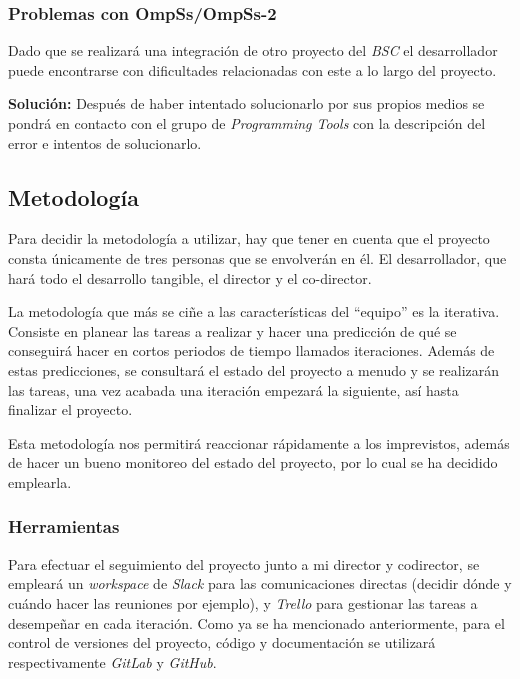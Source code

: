 \subsubsection{Problemas con OmpSs/OmpSs-2}

Dado que se realizará una integración de otro proyecto del \textit{BSC} el desarrollador puede encontrarse con dificultades relacionadas con este a lo largo del proyecto.
\par\medskip

\textbf{Solución:} Después de haber intentado solucionarlo por sus propios medios se pondrá en contacto con el grupo de \textit{Programming Tools} con la descripción del error e intentos de solucionarlo.

\subsection{Metodología}

Para decidir la metodología a utilizar, hay que tener en cuenta que el proyecto consta únicamente de tres personas que se envolverán en él. El desarrollador, que hará todo el desarrollo tangible, el director y el co-director. 
\par\bigskip

La metodología que más se ciñe a las características del ``equipo'' es la iterativa. Consiste en planear las tareas a realizar y hacer una predicción de qué se conseguirá hacer en cortos periodos de tiempo llamados iteraciones. Además de estas predicciones, se consultará el estado del proyecto a menudo y se realizarán las tareas, una vez acabada una iteración empezará la siguiente, así hasta finalizar el proyecto.
\par\bigskip
Esta metodología nos permitirá reaccionar rápidamente a los imprevistos, además de hacer un bueno monitoreo del estado del proyecto, por lo cual se ha decidido emplearla.

\subsubsection{Herramientas}

Para efectuar el seguimiento del proyecto junto a mi director y codirector, se empleará un \textit{workspace} de \textit{Slack} para las comunicaciones directas (decidir dónde y cuándo hacer las reuniones por ejemplo), y \textit{Trello} para gestionar las tareas a desempeñar en cada iteración. Como ya se ha mencionado anteriormente, para el control de versiones del proyecto, código y documentación se utilizará respectivamente \textit{GitLab} y \textit{GitHub}.